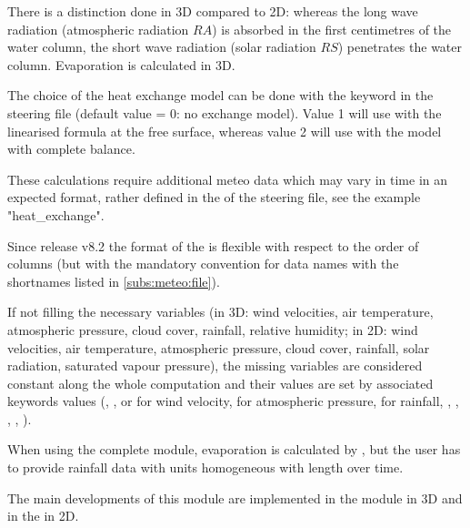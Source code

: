 There is a distinction done in 3D compared to 2D:
whereas the long wave radiation (atmospheric radiation $RA$) is absorbed in
the first centimetres of the water column, the short wave radiation (solar
radiation $RS$) penetrates the water column. Evaporation is calculated in 3D.

The choice of the heat exchange model can be done with the keyword
 in the \waqtel steering file
(default value = 0: no exchange
model). Value 1 will use with the linearised formula at the free surface,
whereas value 2 will use with the model with complete balance.

These calculations require additional meteo data which may vary in time
in an expected format, rather defined
in the  of the  steering file,
see the example "heat\_exchange".

Since release v8.2 the format of the  is
flexible with respect to the order of columns (but with the mandatory convention
for data names with the shortnames listed in \ref{subs:meteo:file}).

If not filling the necessary variables
(in 3D: wind velocities, air temperature, atmospheric pressure, cloud cover,
rainfall, relative humidity;
 in 2D: wind velocities, air temperature, atmospheric pressure, cloud cover,
rainfall, solar radiation, saturated vapour pressure),
the missing variables are considered constant along the whole computation and
their values are set by associated keywords values
(, , or
 for wind velocity,
 for atmospheric pressure,
 for rainfall,
, , ,
, ).


When using the complete module, evaporation is calculated by , but
the user has to provide rainfall data with units homogeneous with length over
time.

The main developments of this module are implemented in the module
 in 3D and in the  in 2D.


